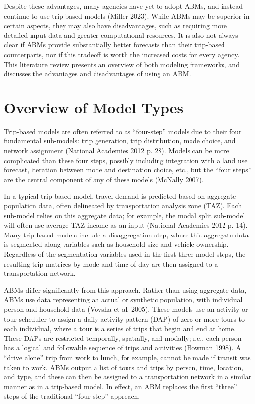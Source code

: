 \documentclass[fancy, oneside, mastersfancy, ms]{byuthesis}
\begin{document}
Despite these advantages, many agencies have yet to adopt ABMs, and
instead continue to use trip-based models (Miller 2023). While ABMs may
be superior in certain aspects, they may also have disadvantages, such
as requiring more detailed input data and greater computational
resources. It is also not always clear if ABMs provide substantially
better forecasts than their trip-based counterparts, nor if this
tradeoff is worth the increased costs for every agency. This literature
review presents an overview of both modeling frameworks, and discusses
the advantages and disadvantages of using an ABM.

\section{Overview of Model Types}\label{overview-of-model-types}

Trip-based models are often referred to as ``four-step'' models due to
their four fundamental sub-models: trip generation, trip distribution,
mode choice, and network assignment (National Academies 2012 p. 28).
Models can be more complicated than these four steps, possibly including
integration with a land use forecast, iteration between mode and
destination choice, etc., but the ``four steps'' are the central
component of any of these models (McNally 2007).

In a typical trip-based model, travel demand is predicted based on
aggregate population data, often delineated by transportation analysis
zone (TAZ). Each sub-model relies on this aggregate data; for example,
the modal split sub-model will often use average TAZ income as an input
(National Academies 2012 p. 14). Many trip-based models include a
disaggregation step, where this aggregate data is segmented along
variables such as household size and vehicle ownership. Regardless of
the segmentation variables used in the first three model steps, the
resulting trip matrices by mode and time of day are then assigned to a
transportation network.

ABMs differ significantly from this approach. Rather than using
aggregate data, ABMs use data representing an actual or synthetic
population, with individual person and household data (Vovsha et al.
2005). These models use an activity or tour scheduler to assign a daily
activity pattern (DAP) of zero or more tours to each individual, where a
tour is a series of trips that begin and end at home. These DAPs are
restricted temporally, spatially, and modally; i.e., each person has a
logical and followable sequence of trips and activities (Bowman 1998). A
``drive alone'' trip from work to lunch, for example, cannot be made if
transit was taken to work. ABMs output a list of tours and trips by
person, time, location, and type, and these can then be assigned to a
transportation network in a similar manner as in a trip-based model. In
effect, an ABM replaces the first ``three'' steps of the traditional
``four-step'' approach.
\end{document}
